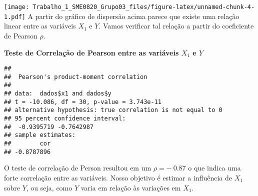\documentclass[
]{article}
\newenvironment{Shaded}{\begin{snugshade}}{\end{snugshade}}
\newcommand{\CommentTok}[1]{\textcolor[rgb]{0.56,0.35,0.01}{\textit{#1}}}
\newcommand{\DataTypeTok}[1]{\textcolor[rgb]{0.13,0.29,0.53}{#1}}
\newcommand{\DecValTok}[1]{\textcolor[rgb]{0.00,0.00,0.81}{#1}}
\newcommand{\FloatTok}[1]{\textcolor[rgb]{0.00,0.00,0.81}{#1}}
\newcommand{\KeywordTok}[1]{\textcolor[rgb]{0.13,0.29,0.53}{\textbf{#1}}}
\newcommand{\NormalTok}[1]{#1}
\newcommand{\OperatorTok}[1]{\textcolor[rgb]{0.81,0.36,0.00}{\textbf{#1}}}
\newcommand{\StringTok}[1]{\textcolor[rgb]{0.31,0.60,0.02}{#1}}
\begin{document}
\begin{Shaded}
\end{Shaded}

\texttt{[image: Trabalho\_1\_SME0820\_Grupo03\_files/figure-latex/unnamed-chunk-4-1.pdf]}
A partir do gráfico de dispersão acima parece que existe uma relação
linear entre as variáveis \(X_1\) e \(Y\). Vamos verificar tal relação a
partir do coeficiente de Pearson \(\rho\).

\textbf{Teste de Correlação de Pearson entre as variáveis \(X_1\) e
\(Y\)}

\begin{Shaded}
\end{Shaded}

\begin{verbatim}
## 
##  Pearson's product-moment correlation
## 
## data:  dados$x1 and dados$y
## t = -10.086, df = 30, p-value = 3.743e-11
## alternative hypothesis: true correlation is not equal to 0
## 95 percent confidence interval:
##  -0.9395719 -0.7642987
## sample estimates:
##        cor 
## -0.8787896
\end{verbatim}

O teste de correlação de Person resultou em um \(\rho = -~0.87\) o que
indica uma forte correlação entre as variáveis. Nosso objetivo é estimar
a influência de \(X_1\) sobre \(Y\), ou seja, como \(Y\) varia em
relação às variações em \(X_1\).
\end{document}
